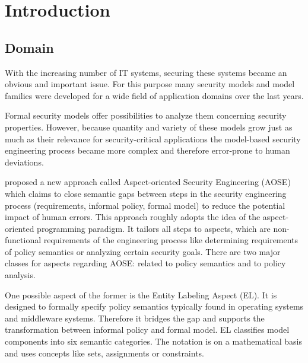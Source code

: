 \documentclass[twoside, openright, 12pt]{book}
\begin{document}
\cleardoublepage
\listoffigures
{}


%







\cleardoublepage
{}
\chapter{Introduction}
\label{introduction}

\section{Domain} 
\label{domain}
With the increasing number of IT systems, securing these systems became an obvious and important issue.
For this purpose many security models and model families were developed for a wide field of application domains over the last years.

Formal security models offer possibilities to analyze them concerning security properties.
However, because quantity and variety of these models grow just as much as their relevance for security-critical applications the model-based security engineering process became more complex and therefore error-prone to human deviations.

\citet*{Amthor18} proposed a new approach called Aspect-oriented Security Engineering (AOSE) which claims to close semantic gaps between steps in the security engineering process (requirements, informal policy, formal model) to reduce the potential impact of human errors.
This approach roughly adopts the idea of the aspect-oriented programming paradigm.
It tailors all steps to aspects, which are non-functional requirements of the engineering process like determining requirements of policy semantics or analyzing certain security goals.
There are two major classes for aspects regarding AOSE: related to policy semantics and to policy analysis.

One possible aspect of the former is the Entity Labeling Aspect (EL).
It is designed to formally specify policy semantics typically found in operating systems and middleware systems.
Therefore it bridges the gap and supports the transformation between informal policy and formal model.
EL classifies model components into six semantic categories.
The notation is on a mathematical basis and uses concepts like sets, assignments or constraints.
\end{document}
